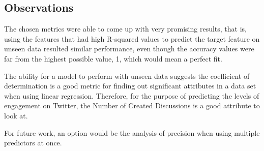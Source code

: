 \documentclass[11pt]{article}
\begin{document}
\subsection {Observations}
\label{obs}
The chosen metrics were able to come up with very promising results, that is, using the features that had high R-squared values to predict the target feature on unseen data resulted similar performance, even though the accuracy values were far from the highest possible value, 1, which would mean a perfect fit.


The ability for a model to perform with unseen data suggests the coefficient of determination is a good metric for finding out significant attributes in a data set when using linear regression. Therefore, for the purpose of predicting the levels of engagement on Twitter, the Number of Created Discussions is a good attribute to look at.

For future work, an option would be the analysis of precision when using multiple predictors at once.

\FloatBarrier
\nocite{*}



\end{document}
